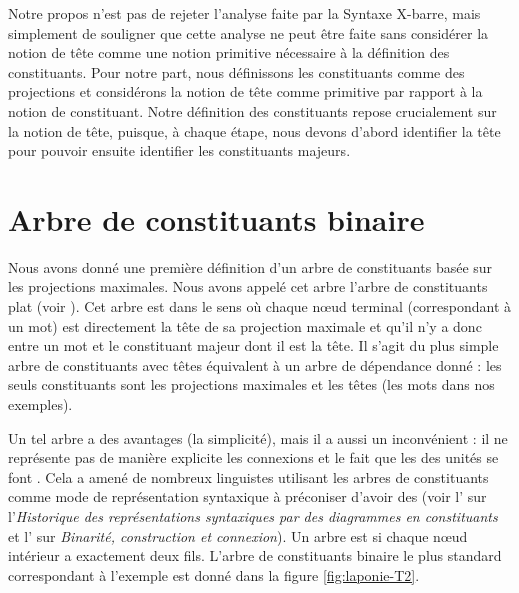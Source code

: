 {    Notre propos n’est pas de rejeter l’analyse faite par la Syntaxe X-barre, mais simplement de souligner que cette analyse ne peut être faite sans considérer la notion de tête comme une notion primitive nécessaire à la définition des constituants. Pour notre part, nous définissons les constituants comme des projections et considérons la notion de tête comme primitive par rapport à la notion de constituant. Notre définition des constituants repose crucialement sur la notion de tête, puisque, à chaque étape, nous devons d’abord identifier la tête pour pouvoir ensuite identifier les constituants majeurs.
}
\section{Arbre de constituants binaire}\label{sec:3.4.14}

Nous avons donné une première définition d’un arbre de constituants basée sur les projections maximales. Nous avons appelé cet arbre l’arbre de constituants plat (voir ). Cet arbre est  dans le sens où chaque nœud terminal (correspondant à un mot) est directement la tête de sa projection maximale et qu’il n’y a donc  entre un mot et le constituant majeur dont il est la tête. Il s’agit du plus simple arbre de constituants avec têtes équivalent à un arbre de dépendance donné : les seuls constituants sont les projections maximales et les têtes (les mots dans nos exemples).

\begin{sloppypar}
Un tel arbre a des avantages (la simplicité), mais il a aussi un inconvénient : il ne représente pas de manière explicite les connexions et le fait que les  des unités se font . Cela a amené de nombreux linguistes utilisant les arbres de constituants comme mode de représentation syntaxique à préconiser d’avoir des  (voir l' sur l’\textit{Historique des représentations syntaxiques par des diagrammes en constituants} et l' sur \textit{Binarité, construction et connexion}). Un arbre est  si chaque nœud intérieur a exactement deux fils. L’arbre de constituants binaire le plus standard correspondant à l'exemple  est donné dans la figure \ref{fig:laponie-T2}.
\end{sloppypar}

